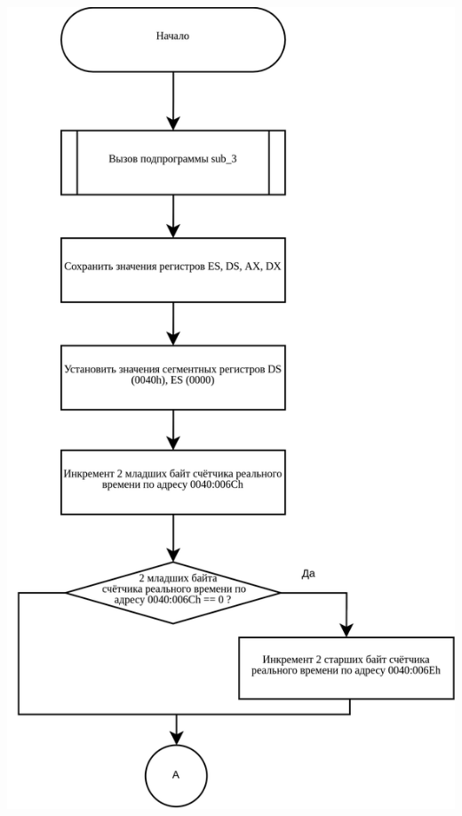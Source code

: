 \documentclass[a4paper,12pt]{article}
\begin{document}
\begin{flushright}
	\includegraphics[height=0.875\textheight]{flowchart/int_8h_1.png}

\end{flushright}
\end{document}
